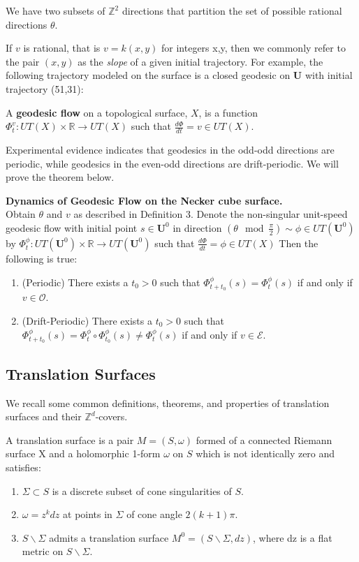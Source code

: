 \documentclass[]{article}
\begin{document}
\noindent We have two subsets of $\mathbb Z^2$ directions that partition the set of possible rational directions $\theta$.


If $v$ is rational, that is $v=k(x,y)$ for integers x,y, then we commonly refer to the pair $(x,y)$ as the \emph{slope} of a given initial trajectory. For example, the following trajectory modeled on the surface is a closed geodesic on $\mathbf{U}$ with initial trajectory (51,31):



\begin{Def}
A \textbf{geodesic flow} on a topological surface, $X$, is a function $\Phi^{v}_t:UT(X)\times\mathbb{R}\rightarrow UT(X)$ such that $\frac{d\Phi}{dt}=v\in UT(X)$. 
\end{Def}

\noindent Experimental evidence indicates that geodesics in the odd-odd directions are periodic, while geodesics in the even-odd directions are drift-periodic. We will prove the theorem below.

\begin{thm}{\textbf{Dynamics of Geodesic Flow on the Necker cube surface.}}\\ Obtain $\theta$ and $v$ as described in Definition 3. Denote the non-singular unit-speed geodesic flow with initial point $s\in\mathbf{U}^0$ in direction $(\theta\mod{\frac{\pi}{2}})\sim\phi\in UT(\mathbf{U}^0)$ by $\Phi^{\phi}_t:UT(\mathbf{U}^0)\times\mathbb{R}\rightarrow UT(\mathbf{U}^0)$ such that $\frac{d\Phi}{dt}=\phi\in UT(X)$  Then the following is true:
\begin{enumerate}[label=(\roman*)]
\item (Periodic) There exists a $t_0 > 0$ such that $\Phi^{\phi}_{t+t_{0}}(s)=\Phi^{\phi}_{t}(s)$ if and only if $v\in\mathcal{O}$.
\item (Drift-Periodic) There exists a $t_0 > 0$ such that $\Phi^{\phi}_{t+t_{0}}(s)= \Phi^{\phi}_{t}\circ\Phi^{\phi}_{t_0}(s)\neq\Phi^{\phi}_t(s)$ if and only if $v\in\mathcal{E}$.
\end{enumerate}
\end{thm}

\subsection{Translation Surfaces}
We recall some common definitions, theorems, and properties of translation surfaces and their $\mathbb{Z}^d$-covers.


\begin{Def}
A translation surface is a pair $M=(S,\omega)$ formed of a connected
Riemann surface X and a holomorphic 1-form $\omega$ on $S$ which is not identically zero and satisfies:
\begin{enumerate}
\item $\Sigma\subset S$ is a discrete subset of cone singularities of $S$.
\item $\omega=z^kdz$ at points in $\Sigma$ of cone angle $2(k+1)\pi$.
\item $S\backslash\Sigma$ admits a translation surface $M^0=(S\backslash\Sigma,dz)$, where dz is a flat metric on $S\backslash\Sigma$.
\end{enumerate}
\end{Def}
\end{document}

